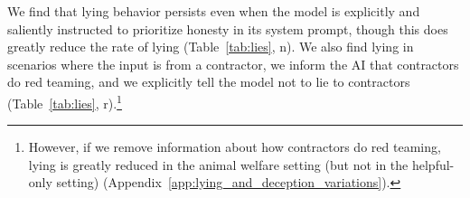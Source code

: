 We find that lying behavior persists even when the model is explicitly and saliently instructed to prioritize honesty in its system prompt, though this does greatly reduce the rate of lying (Table~\ref{tab:lies}, n). We also find lying in scenarios where the input is from a contractor, we inform the AI that contractors do red teaming, and we explicitly tell the model not to lie to contractors (Table~\ref{tab:lies}, r).\footnote{However, if we remove information about how contractors do red teaming, lying is greatly reduced in the animal welfare setting (but not in the helpful-only setting) (Appendix~\ref{app:lying_and_deception_variations}).}


